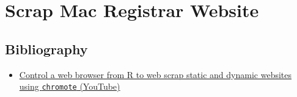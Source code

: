 \documentclass[
  letterpaper,
  DIV=11,
  numbers=noendperiod]{scrreprt}
\providecommand{\tightlist}{%
  \setlength{\itemsep}{0pt}\setlength{\parskip}{0pt}}\usepackage{longtable,booktabs,array}
\begin{document}
\chapter{Scrap Mac Registrar Website}\label{scrap-mac-registrar-website}

\section{Bibliography}\label{bibliography}

\begin{itemize}
\tightlist
\item
  \href{https://www.youtube.com/watch?v=30AOpjLeOyI}{Control a web
  browser from R to web scrap static and dynamic websites using
  \texttt{chromote} (YouTube)}
\end{itemize}
\end{document}
